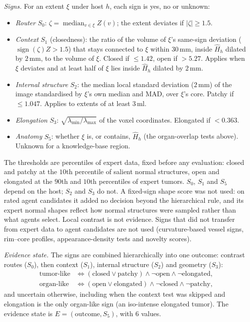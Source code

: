 \documentclass[fleqn,10pt]{olplainarticle}
\begin{document}
\emph{Signs.} For an extent $\xi$ under host $h$, each sign is yes, no or unknown:
\begin{itemize}
\item \emph{Router} $S_0$: $\zeta=\operatorname{median}_{v\in\xi}Z(v)$; the extent deviates if $|\zeta|\ge1.5$.
\item \emph{Context} $S_1$ (closedness): the ratio of the volume of $\xi$'s same-sign deviation ($\operatorname{sign}(\zeta)Z>1.5$)
that stays connected to $\xi$ within $30$\,mm, inside $\hat H_h$ dilated by $2$\,mm, to the volume of $\xi$. Closed if
$\le1.42$, open if $>5.27$. Applies when $\xi$ deviates and at least half of $\xi$ lies inside $\hat H_h$ dilated by $2$\,mm.
\item \emph{Internal structure} $S_2$: the median local standard deviation ($2$\,mm) of the image standardised by $\xi$'s own
median and MAD, over $\xi$'s core. Patchy if $\le1.047$. Applies to extents of at least $3$\,ml.
\item \emph{Elongation} $S_3$: $\sqrt{\lambda_{\min}/\lambda_{\max}}$ of the voxel coordinates. Elongated if $<0.363$.
\item \emph{Anatomy} $S_5$: whether $\xi$ is, or contains, $\hat H_h$ (the organ-overlap tests above). Unknown for a
knowledge-base region.
\end{itemize}
The thresholds are percentiles of expert data, fixed before any evaluation: closed and patchy at the $10$th percentile of
salient normal structures, open and elongated at the $90$th and $10$th percentiles of expert tumors. $S_0$, $S_1$ and $S_5$ depend
on the host; $S_2$ and $S_3$ do not. A fixed-sign shape score was not used: on rated agent candidates it added no
decision beyond the hierarchical rule, and its expert normal shapes reflect how normal structures were sampled rather than what
agents select. Local contrast is not evidence. Signs that did not transfer from expert data to agent
candidates are not used (curvature-based vessel signs, rim--core profiles, appearance-density tests and novelty scores).

\emph{Evidence state.} The signs are combined hierarchically into one outcome: contrast routes ($S_0$), then context ($S_1$),
internal structure ($S_2$) and geometry ($S_3$):
\begin{equation}
\label{eq:tree}
\begin{aligned}
\text{tumor-like}&\iff(\text{closed}\vee\text{patchy})\wedge\neg\text{open}\wedge\neg\text{elongated},\\
\text{organ-like}&\iff(\text{open}\vee\text{elongated})\wedge\neg\text{closed}\wedge\neg\text{patchy},
\end{aligned}
\end{equation}
and uncertain otherwise, including when the context test was skipped and elongation is the only organ-like sign (an
iso-intense elongated tumor). The evidence state is $E=(\text{outcome},S_5)$, with $6$ values.
\end{document}

